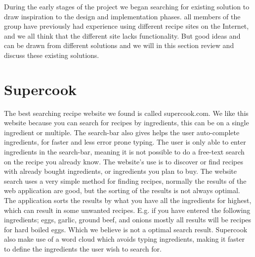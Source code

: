 During the early stages of the project we began searching for existing solution to draw inspiration to the design and implementation phases. all members of the group have previously had experience using different recipe sites on the Internet, and we all think that the different site lacks functionality. But good ideas and can be drawn from different solutions and we will in this section review and discuss these existing solutions.  

\section{Supercook}
The best searching recipe website we found is called supercook.com\cite{supercook}. We like this website because you can search for recipes by ingredients, this can be on a single ingredient or multiple. The search-bar also gives helps the user auto-complete ingredients, for faster and less error prone typing. 
The user is only able to enter ingredients in the search-bar, meaning it is not possible to do a free-text search on the recipe you already know. The website's use is to discover or find recipes with already bought ingredients, or ingredients you plan to buy. 
The website search uses a very simple method for finding recipes, normally the results of the web application are good, but the sorting of the results is not always optimal. The application sorts the results by what you have all the ingredients for highest, which can result in some unwanted recipes. E.g. if you have entered the following ingredients; eggs, garlic, ground beef, and onions mostly all results will be recipes for hard boiled eggs. Which we believe is not a optimal search result.
Supercook also make use of a word cloud which avoids typing ingredients, making it faster to define the ingredients the user wish to search for.

